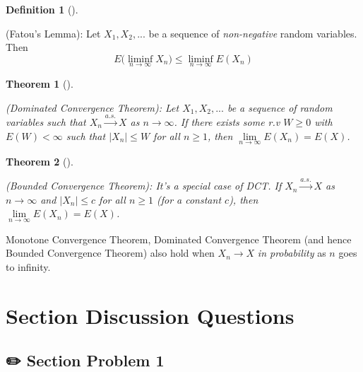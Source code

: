 \documentclass[
  letterpaper,
  DIV=11,
  numbers=noendperiod]{scrreprt}
\theoremstyle{definition}
\newtheorem{definition}{Definition}[chapter]
\theoremstyle{plain}
\newtheorem{theorem}{Theorem}[chapter]
\theoremstyle{remark}
\begin{document}
\leavevmode{}%
\begin{definition}[]\label{def-Fatou-Lemma}

(Fatou's Lemma): Let \(X_1,X_2,...\) be a sequence of
\textit{non-negative} random variables. Then
\[E\Big(  \liminf_{n\to \infty} X_n \Big) \leq \liminf_{n\to \infty} E(X_n)\]

\end{definition}

\leavevmode{}%
\begin{theorem}[]\label{thm-Dominated-Convergence-Theorem}

(Dominated Convergence Theorem): Let \(X_1,X_2,...\) be a sequence of
random variables such that \(X_n \xrightarrow{a.s.} X\) as
\(n\to \infty\). If there exists some r.v \(W\geq 0\) with
\(E(W)<\infty\) such that \(|X_n|\leq W\) for all \(n\geq 1\), then
\(\lim\limits_{n\to \infty}E(X_n) = E(X)\).

\end{theorem}

\leavevmode{}%
\begin{theorem}[]\label{thm-Bounded-Convergence-Theorem}

(Bounded Convergence Theorem): It's a special case of DCT. If
\(X_n \xrightarrow{a.s.} X\) as \(n\to \infty\) and \(|X_n|\leq c\) for
all \(n\geq 1\) (for a constant \(c\)), then
\(\lim\limits_{n\to \infty}E(X_n) = E(X)\).

\end{theorem}

Monotone Convergence Theorem, Dominated Convergence Theorem (and hence
Bounded Convergence Theorem) also hold when \(X_n \to X\)
\textit{in probability} as \(n\) goes to infinity.

\hypertarget{section-discussion-questions-2}{%
\section*{Section Discussion
Questions}\label{section-discussion-questions-2}}


\hypertarget{section-problem-1-3}{%
\subsection*{✏️ Section Problem 1}\label{section-problem-1-3}}
\end{document}
